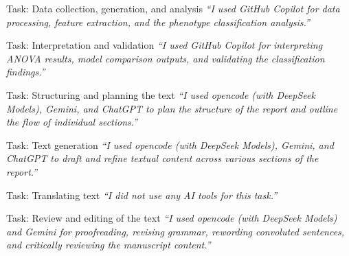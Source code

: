 \documentclass[11pt]{article}
\begin{document}
\vspace{.25em}

\begin{answerbox}{Task: Data collection, generation, and analysis}
  \textit{``I used GitHub Copilot for data processing, feature
  extraction, and the phenotype classification analysis.''}
\end{answerbox}

\vspace{.25em}

\begin{answerbox}{Task: Interpretation and validation}
  \textit{``I used GitHub Copilot for interpreting ANOVA results, model
  comparison outputs, and validating the classification findings.''}
\end{answerbox}

\vspace{.25em}

\begin{answerbox}{Task: Structuring and planning the text}
  \textit{``I used opencode (with DeepSeek Models), Gemini, and ChatGPT
    to plan the structure of the report and outline the flow of
  individual sections.''}
\end{answerbox}

\vspace{.25em}

\begin{answerbox}{Task: Text generation}
  \textit{``I used opencode (with DeepSeek Models), Gemini, and ChatGPT
  to draft and refine textual content across various sections of the report.''}
\end{answerbox}

\vspace{.25em}

\begin{answerbox}{Task: Translating text}
  \textit{``I did not use any AI tools for this task.''}
\end{answerbox}

\vspace{.25em}

\begin{answerbox}{Task: Review and editing of the text}
  \textit{``I used opencode (with DeepSeek Models) and Gemini for
    proofreading, revising grammar, rewording convoluted sentences, and
  critically reviewing the manuscript content.''}
\end{answerbox}

\vspace{.25em}
\end{document}
